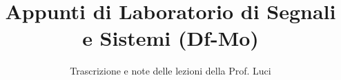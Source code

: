 \documentclass[a4paper,12pt]{article}
\title{Appunti di Laboratorio di Segnali e Sistemi (Df-Mo)}
\author{Trascrizione e note delle lezioni della Prof. Luci}
\date{}
\begin{document}
\maketitle
\projectintro
\tableofcontents
\newpage

\end{document}
